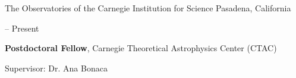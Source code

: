 \documentclass[cv.tex]{subfiles}
\begin{document}
{\color{themecolor} \large
The Observatories of the Carnegie Institution for Science
}
\hfill
Pasadena, California
\par\noindent
\parbox{0.18\textwidth}{%
	\vspace{-1mm}
	 -- Present \par
	\null
}
\hspace{1mm}
\parbox{0.8\textwidth}{%
	\textbf{Postdoctoral Fellow}, Carnegie Theoretical Astrophysics Center 
	(CTAC) \par
	Supervisor: Dr. Ana Bonaca
}
\end{document}
